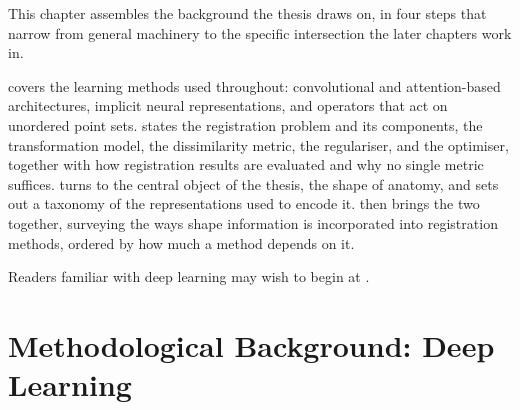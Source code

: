 This chapter assembles the background the thesis draws on, in four steps that narrow from general machinery to the specific intersection the later chapters work in.

 covers the learning methods used throughout: convolutional and attention-based architectures, implicit neural representations, and operators that act on unordered point sets.  states the registration problem and its components, the transformation model, the dissimilarity metric, the regulariser, and the optimiser, together with how registration results are evaluated and why no single metric suffices.  turns to the central object of the thesis, the shape of anatomy, and sets out a taxonomy of the representations used to encode it.  then brings the two together, surveying the ways shape information is incorporated into registration methods, ordered by how much a method depends on it.

Readers familiar with deep learning may wish to begin at .

\section{Methodological Background: Deep Learning}
\label{sec:bg-dl}

